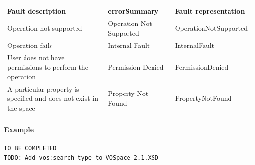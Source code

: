 \documentclass[11pt,a4paper]{ivoa}
\begin{document}
\vspace{3mm}
\begin{tabular}{ p{5cm} l p{4cm} }
\textbf{Fault description} & \textbf{errorSummary} & \textbf{Fault representation} \\
\hline
Operation not supported & Operation Not Supported & OperationNotSupported \\
\hline
Operation fails & Internal Fault & InternalFault \\
\hline
User does not have permissions to perform the operation	 & Permission Denied & PermissionDenied \\
\hline
A particular property is specified and does not exist in the space & Property Not Found & PropertyNotFound \\
\hline
\end{tabular}
\vspace{3mm}

\paragraph{Example}

\begin{lstlisting}
TO BE COMPLETED
TODO: Add vos:search type to VOSpace-2.1.XSD
\end{lstlisting}
\end{document}
